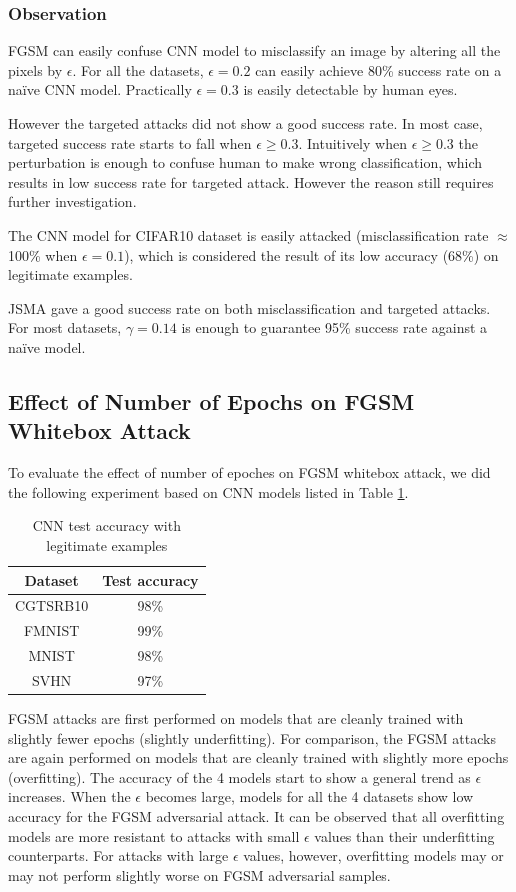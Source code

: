 \documentclass{article}
\begin{document}
\subsubsection{Observation}

FGSM can easily confuse CNN model to misclassify an image by altering all the pixels by \(\epsilon\).
For all the datasets, \(\epsilon=0.2\) can easily achieve 80\% success rate on a na\"ive CNN model.
Practically \(\epsilon=0.3\) is easily detectable by human eyes.

However the targeted attacks did not show a good success rate. In most case, targeted success rate starts to fall when \(\epsilon\geq 0.3\).
Intuitively when \(\epsilon\geq 0.3\) the perturbation is enough to confuse human to make wrong classification,
which results in low success rate for targeted attack. However the reason still requires further investigation.

The CNN model for CIFAR10 dataset is easily attacked (misclassification rate $\approx$ 100\% when \(\epsilon=0.1\)),
which is considered the result of its low accuracy (68\%) on legitimate examples.

JSMA gave a good success rate on both misclassification and targeted attacks.
For most datasets, \(\gamma=0.14\) is enough to guarantee 95\% success rate against a na\"ive model.


\subsection{Effect of Number of Epochs on FGSM Whitebox Attack}

To evaluate the effect of number of epoches on FGSM whitebox attack, we did the following experiment based on CNN models listed in Table \ref{tab:cnnaccuracy2}.

\begin{table}
\centering
\begin{tabular}{cc}
    \toprule
    Dataset & Test accuracy \\
    \midrule
    CGTSRB10 & 98\% \\
    FMNIST & 99\% \\
    MNIST & 98\%  \\
    SVHN & 97\% \\
    \bottomrule
\end{tabular}
\caption{\label{tab:cnnaccuracy2} CNN test accuracy with legitimate examples}
\end{table}

FGSM attacks are first performed on models that are cleanly trained with slightly fewer epochs (slightly underfitting).
For comparison, the FGSM attacks are again performed on models that are cleanly trained with slightly more epochs (overfitting).
The accuracy of the 4 models start to show a general trend as $\epsilon$ increases.
When the $\epsilon$ becomes large, models for all the 4 datasets show low accuracy for the FGSM adversarial attack.
It can be observed that all overfitting models are more resistant to attacks with small $\epsilon$ values than their underfitting counterparts.
For attacks with large $\epsilon$ values, however, overfitting models may or may not perform slightly worse on FGSM adversarial samples.
\end{document}
